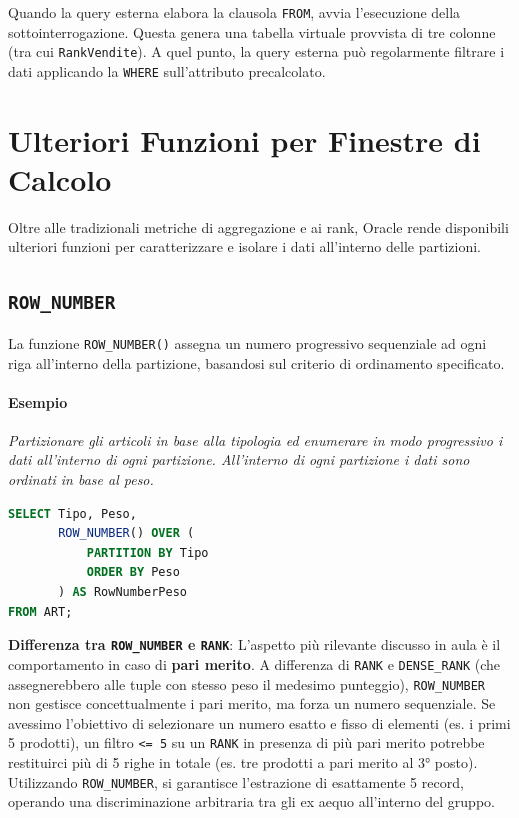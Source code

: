 Quando la query esterna elabora la clausola \texttt{FROM}, avvia l'esecuzione della sottointerrogazione. Questa genera una tabella virtuale provvista di tre colonne (tra cui \texttt{RankVendite}). A quel punto, la query esterna può regolarmente filtrare i dati applicando la \texttt{WHERE} sull'attributo precalcolato.

\section{Ulteriori Funzioni per Finestre di Calcolo}

Oltre alle tradizionali metriche di aggregazione e ai rank, Oracle rende disponibili ulteriori funzioni per caratterizzare e isolare i dati all'interno delle partizioni.

\subsection{\texttt{ROW\_NUMBER}}
La funzione \texttt{ROW\_NUMBER()} assegna un numero progressivo sequenziale ad ogni riga all'interno della partizione, basandosi sul criterio di ordinamento specificato.

\paragraph{Esempio}
\textit{Partizionare gli articoli in base alla tipologia ed enumerare in modo progressivo i dati all'interno di ogni partizione. All'interno di ogni partizione i dati sono ordinati in base al peso.}

\begin{lstlisting}[language=SQL, basicstyle=\small\ttfamily, keywordstyle=\bfseries\color{blue}, frame=single]
SELECT Tipo, Peso, 
       ROW_NUMBER() OVER (
           PARTITION BY Tipo
           ORDER BY Peso
       ) AS RowNumberPeso
FROM ART;
\end{lstlisting}

\textbf{Differenza tra \texttt{ROW\_NUMBER} e \texttt{RANK}}: 
L'aspetto più rilevante discusso in aula è il comportamento in caso di \textbf{pari merito}. A differenza di \texttt{RANK} e \texttt{DENSE\_RANK} (che assegnerebbero alle tuple con stesso peso il medesimo punteggio), \texttt{ROW\_NUMBER} non gestisce concettualmente i pari merito, ma forza un numero sequenziale. 
Se avessimo l'obiettivo di selezionare un numero esatto e fisso di elementi (es. i primi 5 prodotti), un filtro \texttt{<= 5} su un \texttt{RANK} in presenza di più pari merito potrebbe restituirci più di 5 righe in totale (es. tre prodotti a pari merito al 3° posto). Utilizzando \texttt{ROW\_NUMBER}, si garantisce l'estrazione di esattamente 5 record, operando una discriminazione arbitraria tra gli ex aequo all'interno del gruppo.

